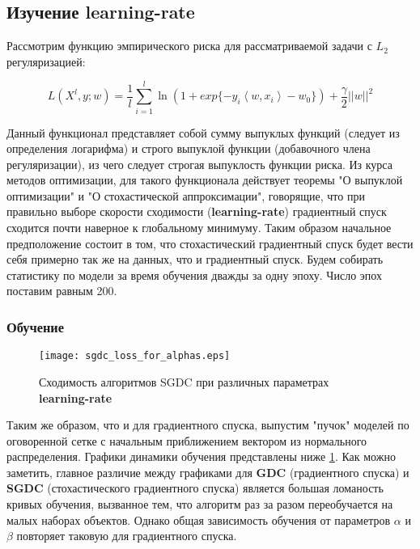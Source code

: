 \documentclass{article}
\begin{document}
    \subsection{Изучение \textbf{learning-rate}}

        Рассмотрим функцию эмпирического риска для рассматриваемой задачи с $L_2$ регуляризацией:

        $$L(X^l, y; w) = \frac{1}{l}\sum_{i=1}^{l}{\ln(1+exp\{-y_i \left\langle w, x_i \right\rangle - w_0\})} + \frac{\gamma}{2}{||w||}^2$$

        Данный функционал представляет собой сумму выпуклых функций (следует из определения логарифма) и строго выпуклой функции (добавочного члена регуляризации), из чего следует строгая выпуклость функции риска. Из курса методов оптимизации, для такого функционала действует теоремы "О выпуклой оптимизации" и "О стохастической аппроксимации", говорящие, что при правильно выборе скорости сходимости (\textbf{learning-rate}) градиентный спуск сходится почти наверное к глобальному минимуму. Таким образом начальное предположение состоит в том, что стохастический градиентный спуск будет вести себя примерно так же на данных, что и градиентный спуск. Будем собирать статистику по модели за время обучения дважды за одну эпоху. Число эпох поставим равным 200.

        \subsubsection{Обучение}
    
        \begin{figure}[t]
            \centerline{\texttt{[image: sgdc\_loss\_for\_alphas.eps]}}
            \caption{Сходимость алгоритмов SGDC при различных параметрах \textbf{learning-rate}}
            \label{fig:sgdc_loss_for_alphas}
        \end{figure}
    
            Таким же образом, что и для градиентного спуска, выпустим "пучок" моделей по оговоренной сетке с начальным приближением вектором из нормального распределения. Графики динамики обучения представлены ниже \ref{fig:sgdc_loss_for_alphas}. Как можно заметить, главное различие между графиками для \textbf{GDC} (градиентного спуска) и \textbf{SGDC} (стохастического градиентного спуска) является большая ломаность кривых обучения, вызванное тем, что алгоритм раз за разом переобучается на малых наборах объектов. Однако общая зависимость обучения от параметров $\alpha$ и $\beta$ повторяет таковую для градиентного спуска.  
\end{document}
